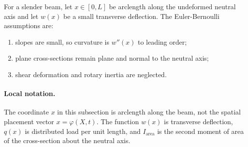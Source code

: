 For a slender beam, let \(x\in[0,L]\) be arclength along the undeformed neutral
axis and let \(w(x)\) be a small transverse deflection. The Euler-Bernoulli
assumptions are:
\begin{enumerate}
\item slopes are small, so curvature is \(w''(x)\) to leading order;
\item plane cross-sections remain plane and normal to the neutral axis;
\item shear deformation and rotary inertia are neglected.
\end{enumerate}

\paragraph{Local notation.}
The coordinate \(x\) in this subsection is arclength along the beam, not the
spatial placement vector \(x=\varphi(X,t)\).  The function \(w(x)\) is
transverse deflection, \(q(x)\) is distributed load per unit length, and
\(I_{\mathrm{area}}\) is the second moment of area of the cross-section about
the neutral axis.

